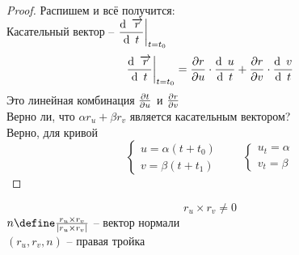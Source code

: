 \begin{proof}
	Распишем и всё получится: \\
	Касательный вектор -- $ \dfrac{\di \vec{r}}{\di t}\clamp{t = t_0} $
	$$ \dfrac{\di \vec{r}}{\di t}\clamp{t = t_0} = \pder{r}{u} \cdot \frac{\di u}{\di t} + \pder{r}v \cdot \frac{\di v}{\di t} $$
	Это линейная комбинация $ \frac{\partial {t}}{\partial {u}} $ и $ \frac{\partial {r}}{\partial {v}} $ \\
	Верно ли, что $ \alpha r_u + \beta r_v $ является касательным вектором? \\
	Верно, для кривой
	$$
	\begin{cases}
		u = \alpha(t + t_0) \\
		v = \beta(t + t_1)
	\end{cases} \qquad
	\begin{cases}
		u_t = \alpha \\
		v_t = \beta
	\end{cases} $$
\end{proof}

$$ r_u \times r_v \ne 0 $$
$ n \define \frac{r_u \times r_v}{|r_u \times r_v|} $ -- вектор нормали \\
$ (r_u, r_v, n) $ -- правая тройка

